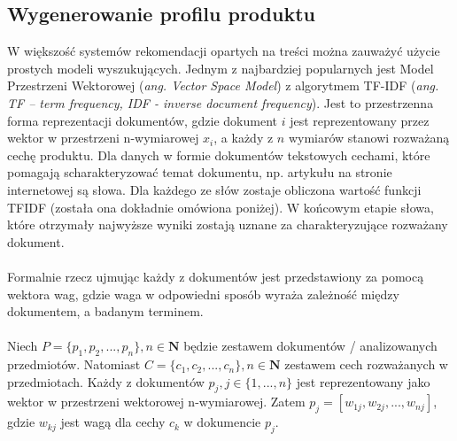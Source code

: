 \documentclass[12pt,a4paper]{report}
\begin{document}
\subsection{Wygenerowanie profilu produktu}
W większość systemów rekomendacji opartych na treści można zauważyć użycie prostych modeli wyszukujących. Jednym z najbardziej popularnych jest Model Przestrzeni Wektorowej (\textit{ang. Vector Space Model}) z algorytmem TF-IDF (\textit{ang. TF – term frequency, IDF - inverse document frequency}). Jest to przestrzenna forma reprezentacji dokumentów, gdzie dokument $i$ jest reprezentowany przez wektor w przestrzeni n-wymiarowej $x_{i}$, a każdy z $n$ wymiarów stanowi rozważaną cechę produktu. Dla danych w formie dokumentów tekstowych cechami, które pomagają scharakteryzować temat dokumentu, np. artykułu na stronie internetowej są słowa. Dla każdego ze słów zostaje obliczona wartość funkcji TFIDF (została ona dokładnie omówiona poniżej). W końcowym etapie słowa, które otrzymały najwyższe wyniki zostają uznane za charakteryzujące rozważany dokument.
\\
\\Formalnie rzecz ujmując każdy z dokumentów jest przedstawiony za pomocą wektora wag, gdzie waga w odpowiedni sposób wyraża zależność między dokumentem, a badanym terminem.
\\
\\Niech \begin{math} P = \{p_1, p_2,...,p_n\}, n\in{\mathbf{N}} \end{math} będzie zestawem dokumentów / analizowanych przedmiotów. Natomiast \begin{math}C = \{c_1, c_2,...,c_n\}, n\in{\mathbf{N}} \end{math} zestawem cech rozważanych w przedmiotach. Każdy z dokumentów \begin{math} p_j, j\in{\{1,...,n\}} \end{math} jest reprezentowany jako wektor w przestrzeni wektorowej n-wymiarowej. Zatem \begin{math} p_j = [w_{1j}, w_{2j},...,w_{nj}] \end{math}, gdzie \begin{math} w_{kj} \end{math}  jest wagą dla cechy \begin{math} c_k \end{math} w dokumencie  \begin{math} p_j \end{math}.
\\
\\
\end{document}
